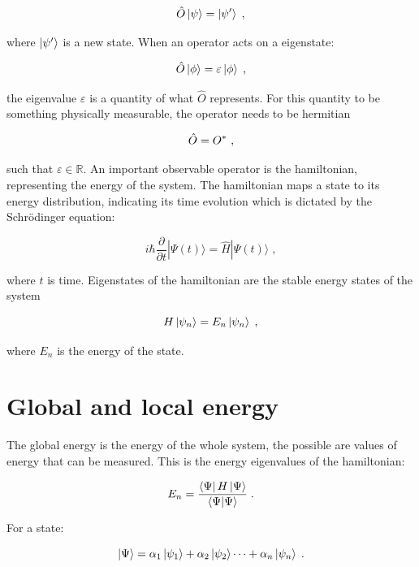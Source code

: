 \begin{equation}
    \hat{O}\ket{\psi} = \ket{\psi'} \; ,
\end{equation}

where $\ket{\psi'}$ is a new state. When an operator acts on a eigenstate:

\begin{equation}
    \hat{O}\ket{\phi} = \varepsilon\ket{\phi} \; ,
\end{equation}

the eigenvalue $\varepsilon$ is a quantity of what $\hat{O}$ represents. For this quantity to be something physically measurable, the operator needs to be hermitian 

\begin{equation}
    \hat{O} = \hc{O} \; ,
\end{equation}

such that $\varepsilon \in \mathbb{R}$. An important observable operator is the hamiltonian, representing the energy of the system. The hamiltonian maps a state to its energy distribution, indicating its time evolution which is dictated by the Schrödinger equation:

\begin{equation}
    i\hbar\frac{\partial}{\partial t} |\Psi(t)\rangle = \hat{H} |\Psi(t)\rangle \; ,
\end{equation}

where $t$ is time. Eigenstates of the hamiltonian are the stable energy states of the system

\begin{equation}
    H\ket{\psi_n} = E_n\ket{\psi_n} \; ,
\end{equation}

where $E_n$ is the energy of the state.

\section{Global and local energy}

The global energy is the energy of the whole system, the possible are values of energy that can be measured. This is the energy eigenvalues of the hamiltonian:

\begin{equation}
    E_n = \frac{\bra{\Psi}H\ket{\Psi}}{\braket{\Psi}{\Psi}} \; .
\end{equation}

For a state:

$$\ket{\Psi} = \alpha_1 \ket{\psi_1} + \alpha_2 \ket{\psi_2} \dots + \alpha_n \ket{\psi_n} \; .$$

